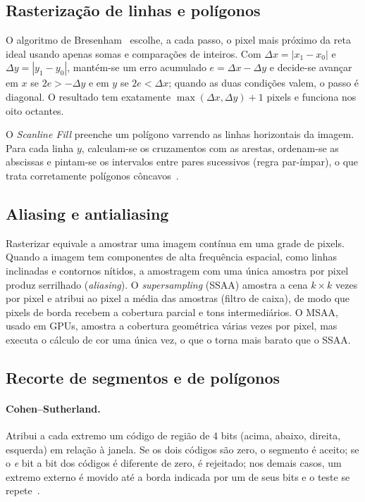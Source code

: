 \documentclass[11pt, a4paper]{article}
\begin{document}
\subsection{Rasterização de linhas e polígonos}
O algoritmo de Bresenham~\cite{bresenham1965} escolhe, a cada passo, o pixel mais próximo da reta ideal usando apenas somas e comparações de inteiros. Com $\Delta x=|x_1-x_0|$ e $\Delta y=|y_1-y_0|$, mantém-se um erro acumulado $e=\Delta x-\Delta y$ e decide-se avançar em $x$ se $2e>-\Delta y$ e em $y$ se $2e<\Delta x$; quando as duas condições valem, o passo é diagonal. O resultado tem exatamente $\max(\Delta x,\Delta y)+1$ pixels e funciona nos oito octantes.

O \emph{Scanline Fill} preenche um polígono varrendo as linhas horizontais da imagem. Para cada linha $y$, calculam-se os cruzamentos com as arestas, ordenam-se as abscissas e pintam-se os intervalos entre pares sucessivos (regra par-ímpar), o que trata corretamente polígonos côncavos~\cite{foley1990}.

\subsection{Aliasing e antialiasing}
Rasterizar equivale a amostrar uma imagem contínua em uma grade de pixels. Quando a imagem tem componentes de alta frequência espacial, como linhas inclinadas e contornos nítidos, a amostragem com uma única amostra por pixel produz serrilhado (\emph{aliasing}). O \emph{supersampling} (SSAA) amostra a cena $k\times k$ vezes por pixel e atribui ao pixel a média das amostras (filtro de caixa), de modo que pixels de borda recebem a cobertura parcial e tons intermediários. O MSAA, usado em GPUs, amostra a cobertura geométrica várias vezes por pixel, mas executa o cálculo de cor uma única vez, o que o torna mais barato que o SSAA.

\subsection{Recorte de segmentos e de polígonos}
\paragraph{Cohen--Sutherland.} Atribui a cada extremo um código de região de 4 bits (acima, abaixo, direita, esquerda) em relação à janela. Se os dois códigos são zero, o segmento é aceito; se o \emph{e} bit a bit dos códigos é diferente de zero, é rejeitado; nos demais casos, um extremo externo é movido até a borda indicada por um de seus bits e o teste se repete~\cite{newman1979}.
\end{document}
